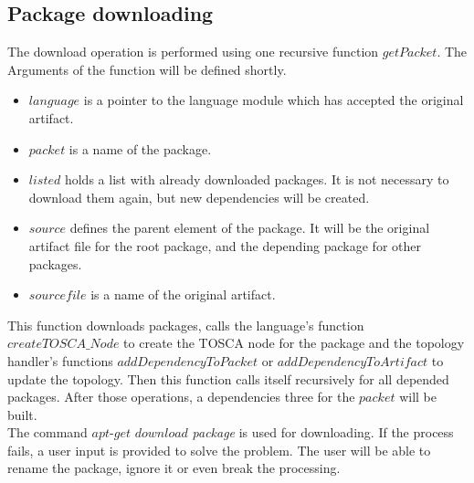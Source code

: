 \subsection*{Package downloading}
The download operation is performed using one recursive function $getPacket$. %
The Arguments of the function will be defined shortly.
\begin{itemize}
	\item $language$ is a pointer to the language module which has accepted the original artifact.
	\item $packet$ is a name of the package.
	\item $listed$ holds a list with already downloaded packages.
	 It is not necessary to download them again, but new dependencies will be created.
	\item $source$ defines the parent element of the package. 
	It will be the original artifact file for the root package, and the depending package for other packages.
	\item $sourcefile$ is a name of the original artifact.
\end{itemize}
This function downloads packages, calls the language's function $createTOSCA\_Node$ to create the TOSCA node for the package and the topology handler's functions $addDependencyToPacket$ or $addDependencyToArtifact$ to update the topology. Then this function calls itself recursively for all depended packages.
After those operations, a dependencies three for the $packet$ will be built.\\
The command $apt$-$get$ $download$ \emph{package} is used for downloading. 
If the process fails, a user input is provided to solve the problem. 
The user will be able to rename the package, ignore it or even break the processing.

